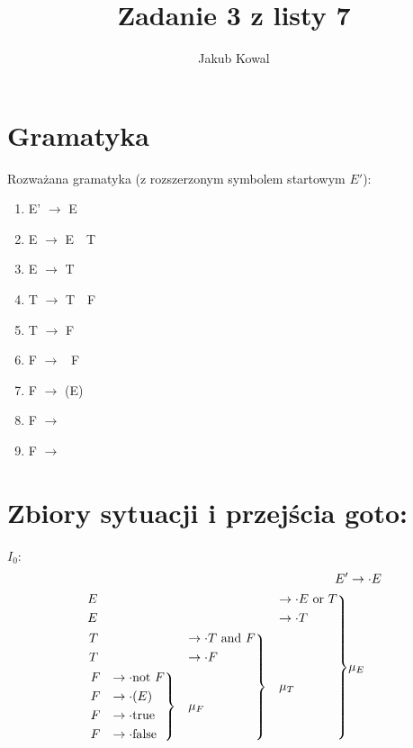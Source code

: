 \documentclass{article}
\title{Zadanie 3 z listy 7}
\author{Jakub Kowal}
\date{}
\begin{document}
\maketitle
\section*{Gramatyka}
Rozważana gramatyka (z rozszerzonym symbolem startowym $E'$):
\begin{center}
\begin{enumerate}
\item E' $\to$ E \\
\item E $\to$ E\ \ T \\
\item E $\to$ T \\
\item T $\to$ T\ \ F \\
\item T $\to$ F \\
\item F $\to$ \ F \\
\item F $\to$ (E) \\
\item F $\to$  \\
\item F $\to$ 
\end{enumerate}
\end{center}

\section*{Zbiory sytuacji i przejścia goto:}
$I_0$:\\
\[
\begin{aligned}
E' &\to \cdot E \\
\begin{rcases}
E &\to \cdot E\ \text{or}\ T \\
E &\to \cdot T \\
\begin{rcases}
T &\to \cdot T\ \text{and}\ F \\
T &\to \cdot F \\
\begin{rcases}
F &\to \cdot \text{not}\ F \\
F &\to \cdot (E) \\
F &\to \cdot \text{true} \\
F &\to \cdot \text{false}
\end{rcases} & \text{$\mu_{F}$}
\end{rcases} & \text{$\mu_{T}$}
\end{rcases} & \text{$\mu_{E}$}
\end{aligned}
\]\\
\end{document}

